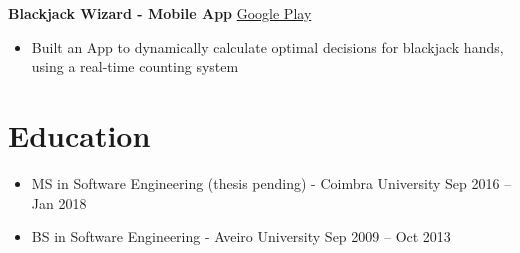 \documentclass[11pt]{article}       %
\begin{document}
\textbf{Blackjack Wizard - Mobile App} \hfill \href{https://play.google.com/store/apps/details?id=pt.psilva.blackjackwizard.demo&pcampaignid=web_share}{Google Play} \\
\vspace{-9pt}
\begin{itemize}
  \item Built an App to dynamically calculate optimal decisions for blackjack hands, using a real-time counting system
\end{itemize}


\vspace{-18.5pt}

\section*{Education}
\begin{itemize}
\item MS in Software Engineering (thesis pending) - Coimbra University \hfill Sep 2016 -- Jan 2018 \\
\item BS in Software Engineering - Aveiro University \hfill Sep 2009 -- Oct 2013
\end{itemize}
\end{document}
